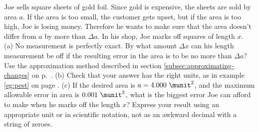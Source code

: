 Joe sells square sheets of gold foil. Since gold is expensive, the sheets
are sold by area $a$. If the area is too small, the customer gets upset, but
if the area is too high, Joe is losing money. Therefore he wants to make
sure that the area doesn't differ from $a$ by more than $\Delta a$.
In his shop, Joe marks off squares of length $x$.\\
(a) No measurement is perfectly exact. By what amount $\Delta x$ can his
length measurement be off if the resulting error in the area is
to be no more than $\Delta a$? Use the approximation method
described in section \ref{subsec:approximating-changes} on 
p.~\pageref{subsec:approximating-changes}.\answercheck\hwendpart
(b)  Check that your answer has the right units, as in example 
\ref{eg:pest} on page \pageref{eg:pest}.\hwendpart
(c) If the desired area is $a=4.000\ \munit^2$, and
the maximum allowable error in area is $0.001\ \munit^2$,
what is the biggest error Joe can afford to make when he
marks off the length $x$? Express your result using an appropriate unit or in scientific notation, not
as an awkward decimal with a string of zeroes.\answercheck
